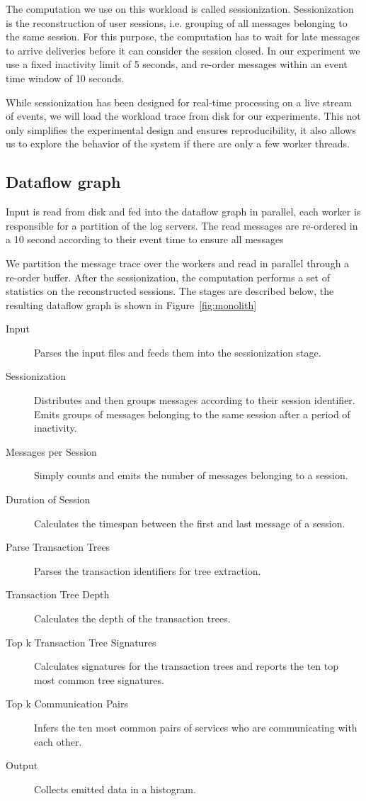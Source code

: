 The computation we use on this workload is called sessionization. Sessionization
is the reconstruction of user sessions, i.e. grouping of all messages belonging
to the same session. For this purpose, the computation has to wait for late
messages to arrive deliveries before it can consider the session closed. In
our experiment we use a fixed inactivity limit of 5 seconds, and re-order messages
within an event time window of 10 seconds. 

While sessionization has been designed for real-time processing on a live
stream of events, we will load the workload trace from disk for our experiments.
This not only simplifies the experimental design and ensures reproducibility,
it also allows us to explore the behavior of the system if there are only a
few worker threads.


\subsection{Dataflow graph}

Input is read from disk and fed into the dataflow graph in parallel, each worker
is responsible for a partition of the log servers. The read messages are
re-ordered in a 10 second according to their event time to ensure all messages 


We partition the message trace over the workers and read in parallel
through a re-order buffer.
After the sessionization, the computation performs a set of statistics on the
reconstructed sessions. The stages are described below, the resulting dataflow
graph is shown in Figure~\ref{fig:monolith}

\begin{description}
\item [Input] Parses the input files and feeds them into the sessionization stage.
\item [Sessionization] Distributes and then groups messages according to their session identifier.
Emits groups of messages belonging to the same session after a period of inactivity.
\item [Messages per Session] Simply counts and emits the number of messages belonging to a session.
\item [Duration of Session] Calculates the timespan between the first and last message of a session.
\item [Parse Transaction Trees] Parses the transaction identifiers for tree extraction.
\item [Transaction Tree Depth] Calculates the depth of the transaction trees.
\item [Top k Transaction Tree Signatures] Calculates signatures for the transaction trees and
reports the ten top most common tree signatures.
\item [Top k Communication Pairs] Infers the ten most common pairs of services who are
communicating with each other.
\item [Output] Collects emitted data in a histogram.
\end{description}

